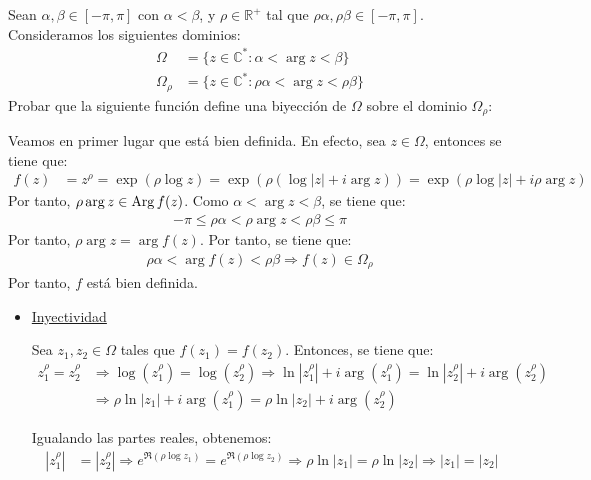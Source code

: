 \begin{ejercicio}
    Sean $\alpha,\beta \in \left[ -\pi, \pi \right]$ con $\alpha < \beta$, y $\rho \in \mathbb{R}^+$ tal que $\rho\alpha,\rho\beta \in \left[ -\pi, \pi \right]$. Consideramos los siguientes dominios:
    \begin{align*}
        \Omega &= \{z \in \mathbb{C}^* : \alpha < \arg z < \beta\} \\
        \Omega_\rho &= \{z \in \mathbb{C}^* : \rho\alpha < \arg z < \rho\beta\}
    \end{align*}
    Probar que la siguiente función define una biyección de $\Omega$ sobre el dominio $\Omega_\rho$:

    Veamos en primer lugar que está bien definida. En efecto, sea $z\in \Omega$, entonces se tiene que:
    \begin{align*}
        f(z) &= z^\rho = \exp(\rho\log z) = \exp\left(\rho\left(\log |z| + i\arg z\right)\right) = \exp\left(\rho\log |z| + i\rho\arg z\right)
    \end{align*}
    Por tanto, $\rho\arg z \in \operatorname{Arg} f(z)$. Como $\alpha < \arg z < \beta$, se tiene que:
    \begin{align*}
        -\pi\leq \rho\alpha < \rho\arg z < \rho\beta\leq \pi
    \end{align*}
    Por tanto, $\rho\arg z=\arg f(z)$. Por tanto, se tiene que:
    \begin{align*}
        \rho\alpha < \arg f(z) < \rho\beta
        \Longrightarrow f(z)\in \Omega_\rho
    \end{align*}
    Por tanto, $f$ está bien definida.
    \begin{itemize}
        \item \ul{Inyectividad}~
        
        Sea $z_1,z_2\in \Omega$ tales que $f(z_1)=f(z_2)$. Entonces, se tiene que:
        \begin{align*}
            z_1^\rho = z_2^\rho &\Longrightarrow \log(z_1^\rho) = \log(z_2^\rho) \Longrightarrow \ln|z_1^\rho| + i\arg(z_1^\rho) = \ln|z_2^\rho| + i\arg(z_2^\rho)\\
            &\Longrightarrow \rho\ln|z_1| + i\arg(z_1^\rho) = \rho\ln|z_2| + i\arg(z_2^\rho)
        \end{align*}

        Igualando las partes reales, obtenemos:
        \begin{align*}
            |z_1^\rho| &= |z_2^\rho| \Longrightarrow e^{\Re(\rho\log z_1)} = e^{\Re(\rho\log z_2)} \Longrightarrow \rho\ln|z_1| = \rho\ln|z_2|\Longrightarrow |z_1| = |z_2|
        \end{align*}
        

\end{itemize}
\end{ejercicio}

